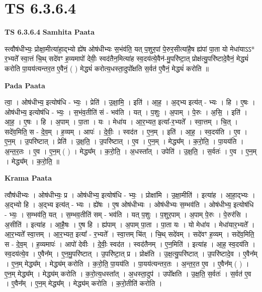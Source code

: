 \documentclass[17pt]{extarticle}
\begin{document}
\section{ TS 6.3.6.4 }

\textbf{TS 6.3.6.4 } \newline
\textbf{Samhita Paata} \newline

स्त्वौष॑धीभ्यः॒ प्रोक्षा॒मीत्या॑हा॒द्भ्यो ह्ये॑ष ओष॑धीभ्यः स॒भंव॑ति॒ यत् प॒शुर॒पां पे॒रुर॒सीत्या॑है॒ष ह्य॑पां पा॒ता यो मेधा॑याऽऽ* र॒भ्यते᳚ स्वा॒त्तं चि॒थ् सदे॑वꣳ ह॒व्यमापो॑ देवीः॒ स्वद॑तैन॒मित्या॑ह स्व॒दय॑त्ये॒वैन॑-मु॒परि॑ष्टा॒त् प्रोक्ष॑त्यु॒परि॑ष्टादे॒वैनं॒ मेद्ध्यं॑ करोति पा॒यय॑त्यन्तर॒त ए॒वैनं॒ ( ) मेद्ध्यं॑ करोत्य॒धस्ता॒दुपो᳚क्षति स॒र्वत॑ ए॒वैनं॒ मेद्ध्यं॑ करोति ॥ \newline

\textbf{Pada Paata} \newline

त्वा॒ । ओष॑धीभ्य॒ इत्योष॑धि - भ्यः॒ । प्रेति॑ । उ॒क्षा॒मि॒ । इति॑ । आ॒ह॒ । अ॒द्भ्य इत्य॑त् - भ्यः । हि । ए॒षः । ओष॑धीभ्य॒ इत्योष॑धि - भ्यः॒ । स॒भंव॒तीति॑ सं - भव॑ति । यत् । प॒शुः । अ॒पाम् । पे॒रुः । अ॒सि॒ । इति॑ । आ॒ह॒ । ए॒षः । हि । अ॒पाम् । पा॒ता । यः । मेधा॑य । आ॒र॒भ्यत॒ इत्या᳚-र॒भ्यते᳚ । स्वा॒त्तम् । चि॒त् । सदे॑व॒मिति॒ स - दे॒व॒म् । ह॒व्यम् । आपः॑ । दे॒वीः॒ । स्वद॑त । ए॒न॒म् । इति॑ । आ॒ह॒ । स्व॒दय॑ति । ए॒व । ए॒न॒म् । उ॒परि॑ष्टात् । प्रेति॑ । उ॒क्ष॒ति॒ । उ॒परि॑ष्टात् । ए॒व । ए॒न॒म् । मेद्ध्य᳚म् । क॒रो॒ति॒ । पा॒यय॑ति । अ॒न्त॒र॒तः । ए॒व । ए॒न॒म् ( ) । मेद्ध्य᳚म् । क॒रो॒ति॒ । अ॒धस्ता᳚त् । उपेति॑ । उ॒क्ष॒ति॒ । स॒र्वतः॑ । ए॒व । ए॒न॒म् । मेद्ध्य᳚म् । क॒रो॒ति॒ ॥  \newline


\textbf{Krama Paata} \newline

त्वौष॑धीभ्यः । ओष॑धीभ्यः॒ प्र । ओष॑धीभ्य॒ इत्योष॑धि - भ्यः॒ । प्रोक्षा॑मि । उ॒क्षा॒मीति॑ । इत्या॑ह । आ॒हा॒द्भ्यः । अ॒द्भ्यो हि । अ॒द्भ्य इत्य॑त् - भ्यः । ह्ये॑षः । ए॒ष ओष॑धीभ्यः । ओष॑धीभ्यः स॒म्भव॑ति । ओष॑धीभ्य॒ इत्योष॑धि - भ्यः॒ । स॒म्भव॑ति॒ यत् । स॒म्भव॒तीति॑ सम् - भव॑ति । यत् प॒शुः । प॒शुर॒पाम् । अ॒पाम् पे॒रुः । पे॒रुर॑सि । अ॒सीति॑ । इत्या॑ह । आ॒है॒षः । ए॒ष हि । ह्य॑पाम् । अ॒पाम् पा॒ता । पा॒ता यः । यो मेधा॑य । मेधा॑यार॒भ्यते᳚ । आ॒र॒भ्यते᳚ स्वा॒त्तम् । आ॒र॒भ्यत॒ इत्या᳚ - र॒भ्यते᳚ । स्वा॒त्तम् चि॑त् । चि॒थ् सदे॑वम् । सदे॑वꣳ ह॒व्यम् । सदे॑व॒मिति॒ स - दे॒व॒म् । ह॒व्यमापः॑ । आपो॑ देवीः । दे॒वीः॒ स्वद॑त । स्वद॑तैनम् । ए॒न॒मिति॑ । इत्या॑ह । आ॒ह॒ स्व॒दय॑ति । स्व॒दय॑त्ये॒व । ए॒वैन᳚म् । ए॒न॒मु॒परि॑ष्टात् । उ॒परि॑ष्टा॒त् प्र । प्रोक्ष॑ति । उ॒क्ष॒त्यु॒परि॑ष्टात् । उ॒परि॑ष्टादे॒व । ए॒वैन᳚म् । ए॒न॒म् मेद्ध्य᳚म् । मेद्ध्य॑म् करोति । क॒रो॒ति॒ पा॒यय॑ति । पा॒यय॑त्यन्तर॒तः । अ॒न्त॒र॒त ए॒व । ए॒वैन᳚म् ( ) । ए॒न॒म् मेद्ध्य᳚म् । मेद्ध्य॑म् करोति । क॒रो॒त्य॒धस्ता᳚त् । अ॒धस्ता॒दुप॑ । उपो᳚क्षति । उ॒क्ष॒ति॒ स॒र्वतः॑ । स॒र्वत॑ ए॒व । ए॒वैन᳚म् । ए॒न॒म् मेद्ध्य᳚म् । मेद्ध्य॑म् करोति । क॒रो॒तीति॑ करोति । \newline
\end{document}
